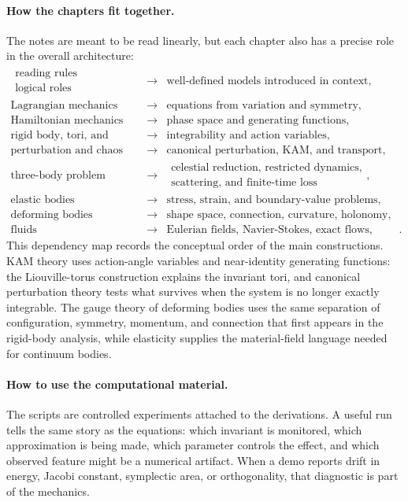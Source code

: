 \documentclass[11pt]{book}
\begin{document}
\paragraph{How the chapters fit together.}
The notes are meant to be read linearly, but each chapter also has a precise
role in the overall architecture:
\[
\begin{array}{ccl}
\begin{gathered}
\text{reading rules}\\
\text{logical roles}
\end{gathered}
&\longrightarrow&
\text{well-defined models introduced in context},\\
\text{Lagrangian mechanics} &\longrightarrow&
\text{equations from variation and symmetry},\\
\text{Hamiltonian mechanics} &\longrightarrow&
\text{phase space and generating functions},\\
\text{rigid body, tori, and actions} &\longrightarrow&
\text{integrability and action variables},\\
\text{perturbation and chaos} &\longrightarrow&
\text{canonical perturbation, KAM, and transport},\\
\text{three-body problem} &\longrightarrow&
\begin{gathered}
\text{celestial reduction, restricted dynamics,}\\
\text{scattering, and finite-time loss}
\end{gathered},\\
\text{elastic bodies} &\longrightarrow&
\text{stress, strain, and boundary-value problems},\\
\text{deforming bodies} &\longrightarrow&
\text{shape space, connection, curvature, holonomy},\\
\text{fluids} &\longrightarrow&
\text{Eulerian fields, Navier-Stokes, exact flows, stability}.
\end{array}
\]
This dependency map records the conceptual order of the main constructions.
KAM theory uses action-angle variables and near-identity generating functions:
the Liouville-torus construction explains the invariant tori, and canonical
perturbation theory tests what survives when the system is no longer exactly
integrable.  The gauge theory of deforming bodies uses the same separation of
configuration, symmetry, momentum, and connection that first appears in the
rigid-body analysis, while elasticity supplies the material-field language
needed for continuum bodies.

\paragraph{How to use the computational material.}
The scripts are controlled experiments attached to the derivations. A useful
run tells the same story as the equations: which invariant is monitored, which
approximation is being made, which parameter controls the effect, and which
observed feature might be a numerical artifact. When a demo reports drift in
energy, Jacobi constant, symplectic area, or orthogonality, that diagnostic is
part of the mechanics.
\end{document}
